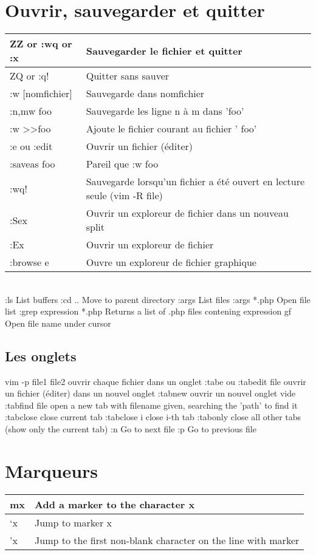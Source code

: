 \documentclass{article}
\begin{document}
\section{Ouvrir, sauvegarder et quitter}
\begin{tabular}{|p{3cm}| l|  }
	\hline
	ZZ or :wq or :x & Sauvegarder le fichier et quitter\\ \hline
	ZQ or :q! & Quitter sans sauver\\ \hline
	:w [nomfichier]& Sauvegarde dans nomfichier \\ \hline
	:n,mw foo & Sauvegarde les ligne n à m dans 'foo' \\ \hline
	:w \textgreater \textgreater  foo & Ajoute le fichier courant au fichier ' foo'\\ \hline
	:e ou :edit & Ouvrir un fichier (éditer) \\ \hline
	:saveas  foo & Pareil que :w foo \\ \hline
	:wq! & Sauvegarde lorsqu'un fichier a été ouvert en lecture seule (vim -R file)\\ \hline
	:Sex & Ouvrir un exploreur de fichier  dans un nouveau split\\ \hline
	:Ex & Ouvrir un exploreur de fichier\\ \hline
	:browse e 	& Ouvre un exploreur de fichier graphique\\ \hline
\end{tabular}\\
	
	:ls 	List buffers
	:cd .. 	Move to parent directory
	:args 	List files
	:args *.php 	Open file list
	:grep expression *.php 	Returns a list of .php files contening expression
	gf 	Open file name under cursor
\subsection{Les onglets}
	vim -p file1 file2 ouvrir chaque fichier dans un onglet
	:tabe  ou :tabedit {file}   ouvrir un fichier (éditer) dans un nouvel onglet
	:tabnew 		ouvrir un nouvel onglet vide
	:tabfind {file}   open a new tab with filename given, searching the 'path' to find it
	:tabclose         close current tab
	:tabclose {i}     close i-th tab
	:tabonly          close all other tabs (show only the current tab)
	:n	Go to next file
	:p	Go to previous file

\section{Marqueurs}
\begin{tabular}{|p{3cm}| l|  }
	\hline
mx & Add a marker to the character x\\ \hline
	`x & Jump to marker x\\ \hline
	'x & Jump to the first non-blank character on the line with marker\\ \hline
\end{tabular}\\
\end{document}
